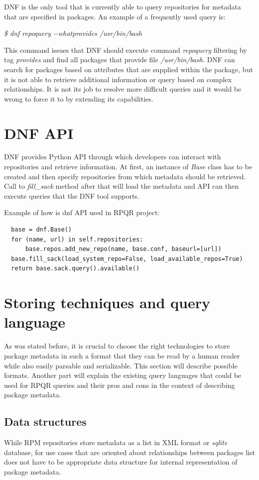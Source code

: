 DNF is the only tool that is currently able to query repositories for metadata that are specified
in packages. An example of a frequently used query is:

\textit{\$ dnf repoquery -{}-whatprovides /usr/bin/bash}

This command issues that DNF should execute command \textit{repoquery} filtering by tag \mbox{\textit{provides}}
and find all packages that provide file \textit{/usr/bin/bash}. DNF can search for packages based on
attributes that are supplied within the package, but it is not able to retrieve additional information
or query based on complex relationships. It is not its job to resolve more difficult queries and
it would be wrong to force it to by extending its capabilities.

\section{DNF API}
DNF provides Python API through which developers can interact with repositories and retrieve information.
At first, an instance of \textit{Base} class has to be created and then specify repositories from which
metadata should be retrieved. Call to \textit{fill\_sack} method after that will load the metadata
and API can then execute queries that the DNF tool supports.

Example of how is dnf API used in RPQR project:
\begin{lstlisting}
  base = dnf.Base()
  for (name, url) in self.repositories:
      base.repos.add_new_repo(name, base.conf, baseurl=[url])
  base.fill_sack(load_system_repo=False, load_available_repos=True)
  return base.sack.query().available()
\end{lstlisting}

\section{Storing techniques and query language}
As was stated before, it is crucial to choose the right technologies to store package metadata in
such a format that they can be read by a human reader while also easily parsable and serializable.
This section will describe possible formats. Another part will explain the existing query
languages that could be used for RPQR queries and their pros and cons in the context of describing
package metadata.

\subsection*{Data structures}
While RPM repositories store metadata as a list in XML format or \textit{sqlite} database, for use cases that
are oriented about relationships between packages list does not have to be appropriate data
structure for internal representation of package metadata.

